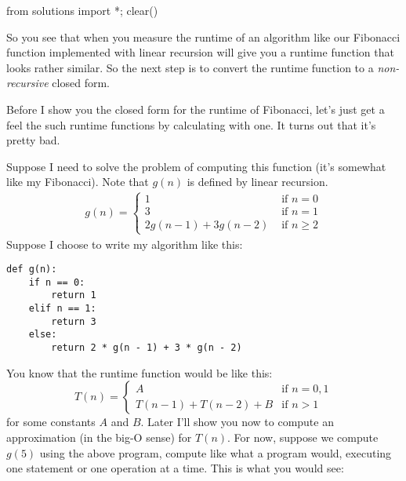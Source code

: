 \begin{python0}
from solutions import *; clear()
\end{python0}

So you see that when you measure the runtime of an algorithm
like our Fibonacci function implemented with linear recursion
will give you a runtime function that looks rather similar.
So the next step is to convert the runtime function
to a \textit{non-recursive} closed form.

Before I show you the closed form for the runtime of Fibonacci, let's just get a feel the
such runtime functions by calculating with one.
It turns out that it's pretty bad.

Suppose I need to solve the problem of computing this
function (it's somewhat like my Fibonacci).
Note that $g(n)$ is defined by linear recursion.
\begin{align*}
g(n) = 
\begin{cases}
1                     & \text{ if $n = 0$} \\
3                     & \text{ if $n = 1$} \\
2g(n - 1) + 3g(n - 2) & \text{ if $n \geq 2$}
\end{cases}
\end{align*}
Suppose I choose to write my algorithm like this:
\begin{Verbatim}[frame=single,fontsize=\footnotesize]
def g(n):
    if n == 0: 
        return 1
    elif n == 1:
        return 3
    else:
        return 2 * g(n - 1) + 3 * g(n - 2)
\end{Verbatim}
You know that the runtime function would be like this:
\[
T(n) = 
\begin{cases}
A                     & \text{if $n = 0, 1$} \\
T(n-1) + T(n-2) + B & \text{if $n > 1$}
\end{cases}
\]
for some constants $A$ and $B$.
Later I'll show you now to compute an approximation (in the big-O sense)
for $T(n)$.
For now, suppose we compute $g(5)$ using the above 
program, compute like what a program would, executing one statement
or one operation at a time.
This is what you would see:

